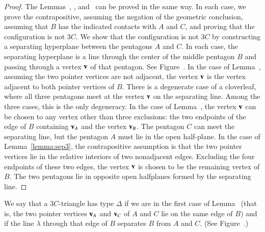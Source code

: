 \begin{proof} The Lemmas~, ,
  and~ can be proved in the same way.  In each case,
  we prove the contrapositive, assuming the negation of the geometric
  conclusion, assuming that $B$ has the indicated contacts with $A$ and $C$,
  and proving that the configuration is not $3C$.  We show
  that the configuration is not $3C$ by constructing a separating
  hyperplane between the pentagons $A$ and $C$.  In each case, the
  separating hyperplane is a line through the center of the middle
  pentagon $B$ and passing through a vertex ${\mathbf v}$ of that pentagon.
  See Figure~.
  In the case of Lemma~, assuming the two pointer
  vertices are not adjacent,
   the vertex ${\mathbf v}$ is the vertex adjacent to both
  pointer vertices of $B$.
  There is a degenerate case of a cloverleaf, where all three
  pentagons meet at the vertex ${\mathbf v}$ on the separating line.
  Among the three cases, this is the only degeneracy.
  In the case of Lemma~, the vertex ${\mathbf v}$ can be
  chosen to any vertex other than three exclusions: the two endpoints
  of the edge of $B$ containing ${\mathbf v}_A$ and the vertex ${\mathbf v}_B$.  The
  pentagon $C$ can meet the separating line, but the pentagon $A$ must
  lie in the open half-plane.
  In the case of Lemma~\ref{lemma:sep3}, the contrapositive assumption
  is that the two pointer vertices lie in the relative interiors of two
  nonadjacent edges.  Excluding the four endpoints of these two edges,
  the vertex ${\mathbf v}$ is chosen to be the remaining vertex of $B$. The two pentagons
  lie in opposite open halfplanes formed by the separating line.
\end{proof}

\begin{definition}[$\Delta$]
We say that a $3C$-triangle has type $\Delta$ if we are in the first
  case of Lemma~ (that is, the two pointer vertices
  ${\mathbf v}_A$ and ${\mathbf v}_C$ of $A$ and $C$ lie on the same edge of $B$) and if
  the line $\lambda$ through that edge of $B$ separates $B$ from $A$
  and $C$. (See Figure~.)
\end{definition}


